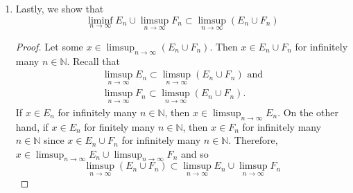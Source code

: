\documentclass[12pt]{article}
\newcommand{\N}{\mathbb{N}}
\newenvironment{problem}[2][Problem]{\begin{trivlist}
		\item[\hskip \labelsep {\bfseries #1}\hskip \labelsep {\bfseries #2.}]}{\end{trivlist}}
\begin{document}
\begin{problem}{1}
\begin{enumerate}[label=(\alph*)]
\begin{enumerate}[label=\textbf{\arabic*.}]
	\item Lastly, we show that
	\begin{equation*}
		\liminf_{n\to \infty} E_{n} \cup  \limsup_{n\to \infty} F_{n} \subset \limsup_{n\to \infty} \left(E_{n} \cup F_{n}\right)
	\end{equation*}
	\begin{proof}
		Let some $x\in \limsup_{n\to \infty} \left(E_{n}\cup F_{n}\right)$. Then $x\in E_{n} \cup F_{n}$ for infinitely many $n\in \N$. Recall that
		\begin{align*}
			\limsup_{n\to \infty}E_{n} \subset \limsup_{n\to \infty} \left(E_{n} \cup F_{n}\right) \text{ and}\\
			\limsup_{n\to \infty} F_{n} \subset \limsup_{n\to \infty} \left(E_{n} \cup F_{n}\right). 
		\end{align*} 
	If $x\in E_{n}$ for infinitely many $n\in \N$, then $x\in \limsup_{n\to \infty} E_{n}$. On the other hand, if $x\in E_{n}$ for finitely many $n\in \N$, then $x\in F_{n}$ for infinitely many $n\in \N$ since $x\in E_{n}\cup F_{n}$ for infinitely many $n\in \N$. Therefore, $x\in \limsup_{n\to \infty} E_{n} \cup \limsup_{n\to \infty} F_{n}$ and so
		\begin{equation*}
			\limsup_{n\to \infty} \left(E_{n}\cup F_{n}\right) \subset \limsup_{n\to \infty}E_{n}\cup \limsup_{n\to \infty}F_{n}
		\end{equation*}
	\end{proof}
	\end{enumerate}


\end{enumerate}
\end{problem}
\end{document}
